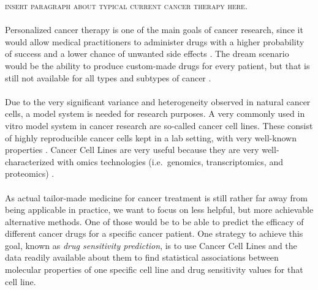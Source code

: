\textsc{insert paragraph about typical current cancer therapy here.}\\~\\
Personalized cancer therapy is one of the main goals of cancer research, since it would allow medical practitioners to administer drugs with a higher probability of success and a lower chance of unwanted side effects \cite{meric2012overcoming}. The dream scenario would be the ability to produce custom-made drugs for every patient, but that is still not available for all types and subtypes of cancer \cite{personalized_cancer_medicine}.\\~\\
Due to the very significant variance and heterogeneity observed in natural cancer cells, a model system is needed for research purposes. A very commonly used in vitro model system in cancer research are so-called cancer cell lines. These consist of highly reproducible cancer cells kept in a lab setting, with very well-known properties \cite{cancer_cell_line_definition}. Cancer Cell Lines are very useful because they are very well-characterized with omics technologies (i.e.\ genomics, transcriptomics, and proteomics) \cite{cancer_cell_lines_useful_model}.\\~\\
As actual tailor-made medicine for cancer treatment is still rather far away from being applicable in practice, we want to focus on less helpful, but more achievable alternative methods. One of those would be to be able to predict the efficacy of different cancer drugs for a specific cancer patient. One strategy to achieve this goal, known as \textit{drug sensitivity prediction}, is to use Cancer Cell Lines and the data readily available about them to find statistical associations between molecular properties of one specific cell line and drug sensitivity values for that cell line.\\~\\